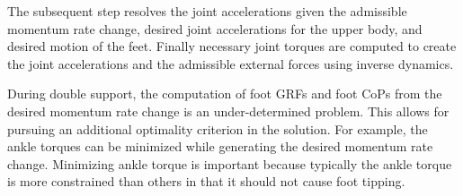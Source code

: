 \documentclass{llncs}
\begin{document}
The subsequent step resolves the joint accelerations given
the admissible momentum rate change, desired joint accelerations for the upper body,
and desired motion of the feet.
Finally necessary joint torques are computed to create
the joint accelerations and the admissible external forces
using inverse dynamics.


During double support, the computation of foot GRFs and foot CoPs
from the desired momentum rate change is an under-determined problem. This
allows for pursuing an additional optimality criterion in the solution.
For example, the ankle torques can be minimized while generating
the desired momentum rate change.
Minimizing ankle torque is important because
typically the ankle torque is more constrained than
others in that it should not cause foot tipping.



\end{document}

